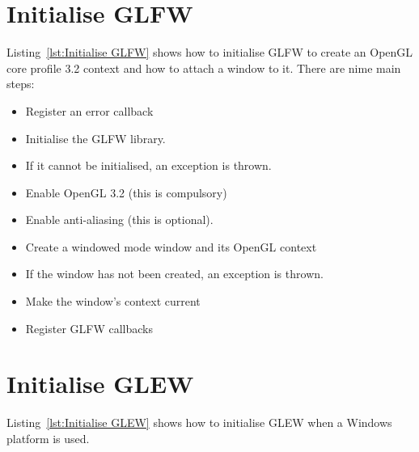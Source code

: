 \documentclass[11pt,oneside,a4paper,final]{article}
\begin{document}
\begin{center}

\end{center}


\section{Initialise GLFW}
\label{sec:Initialise GLFW}

Listing~\ref{lst:Initialise GLFW} shows how to initialise GLFW to create an 
OpenGL core profile 3.2 context and how to attach a window to it. There are 
nime main steps:
\begin{itemize}
    \item Register an error callback
    \item Initialise the GLFW library.
    \item If it cannot be initialised, an exception is thrown.
    \item Enable OpenGL 3.2 (this is compulsory)
    \item Enable anti-aliasing (this is optional).
    \item Create a windowed mode window and its OpenGL context
    \item If the window has not been created, an exception is thrown.
    \item Make the window's context current
    \item Register GLFW callbacks
\end{itemize}

\begin{center}

\end{center}


\section{Initialise GLEW}
\label{sec:Initialise GLEW}

Listing~\ref{lst:Initialise GLEW} shows how to initialise GLEW when a Windows 
platform is used.

\begin{center}

\end{center}
\end{document}
